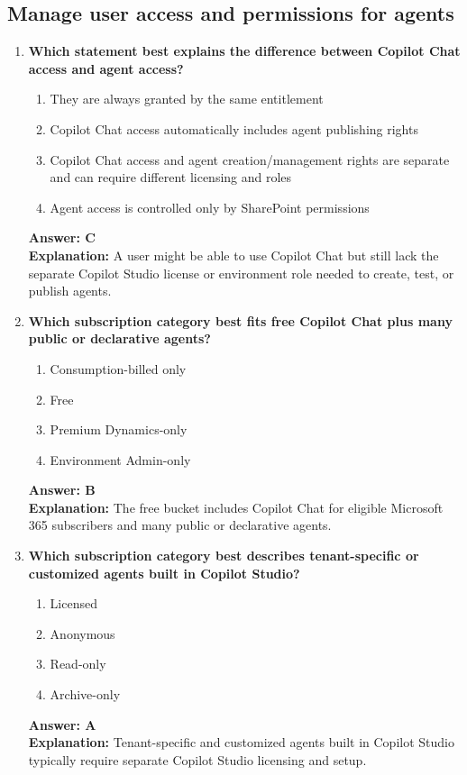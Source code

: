 \documentclass[10pt]{article}
\begin{document}
\subsection{Manage user access and permissions for agents}
\begin{enumerate}[leftmargin=*]

\item \textbf{Which statement best explains the difference between Copilot Chat access and agent access?}
\begin{enumerate}[label=\Alph*.]
  \item They are always granted by the same entitlement
  \item Copilot Chat access automatically includes agent publishing rights
  \item Copilot Chat access and agent creation/management rights are separate and can require different licensing and roles
  \item Agent access is controlled only by SharePoint permissions
\end{enumerate}
\textbf{Answer: C}\\
\textbf{Explanation:} A user might be able to use Copilot Chat but still lack the separate Copilot Studio license or environment role needed to create, test, or publish agents.

\item \textbf{Which subscription category best fits free Copilot Chat plus many public or declarative agents?}
\begin{enumerate}[label=\Alph*.]
  \item Consumption-billed only
  \item Free
  \item Premium Dynamics-only
  \item Environment Admin-only
\end{enumerate}
\textbf{Answer: B}\\
\textbf{Explanation:} The free bucket includes Copilot Chat for eligible Microsoft 365 subscribers and many public or declarative agents.

\item \textbf{Which subscription category best describes tenant-specific or customized agents built in Copilot Studio?}
\begin{enumerate}[label=\Alph*.]
  \item Licensed
  \item Anonymous
  \item Read-only
  \item Archive-only
\end{enumerate}
\textbf{Answer: A}\\
\textbf{Explanation:} Tenant-specific and customized agents built in Copilot Studio typically require separate Copilot Studio licensing and setup.


\end{enumerate}
\end{document}
